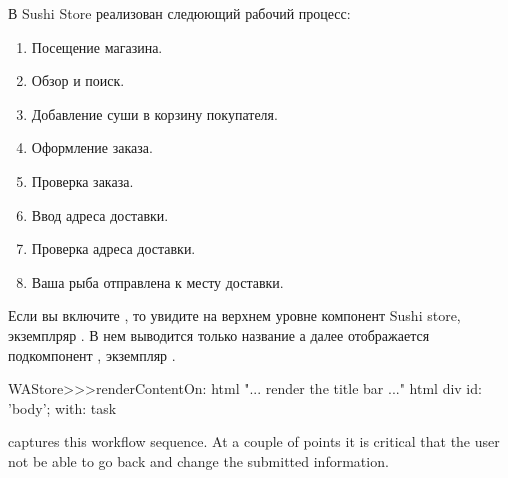 \documentclass[a4paper,10pt,twoside]{book}
\begin{document}

В Sushi Store реализован следюющий рабочий процесс:
\begin{enumerate}[itemsep=0pt]
 \item Посещение магазина.
 \item Обзор и поиск.
 \item Добавление суши в корзину покупателя.
 \item Оформление заказа.
 \item Проверка заказа.
 \item Ввод адреса доставки.
 \item Проверка адреса доставки.
 \item Ваша рыба отправлена к месту доставки.
\end{enumerate}


Если вы включите , то увидите на верхнем уровне
компонент Sushi store, экземплряр .
В нем выводится только название а далее отображается подкомпонент
, экземпляр .

\begin{code}{}
WAStore>>>renderContentOn: html
	"... render the title bar ..."
	html div id: 'body'; with: task
\end{code}

 captures this workflow sequence. At a couple of points it is
critical that the user not be able to go back and change the submitted information.
\end{document}

